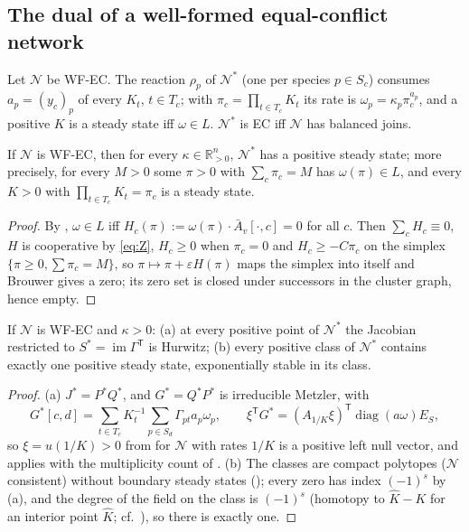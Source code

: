 \documentclass[11pt,a4paper]{report}
\newcommand{\Net}{\mathcal{N}}
\newcommand{\Nd}{\mathcal{N}^{*}}
\newcommand{\im}{\operatorname{im}}
\newcommand{\Rp}{\mathbb{R}_{>0}}
\newcommand{\tp}{^{\mathsf T}}
\begin{document}
\subsection{The dual of a well-formed equal-conflict network}

Let \(\Net\) be WF-EC. The reaction \(\rho_p\) of \(\Nd\) (one per species \(p\in S_c\)) consumes \(a_p=(y_c)_p\) of
every \(K_t\), \(t\in T_c\); with \(\pi_c=\prod_{t\in T_c}K_t\) its rate is \(\omega_p=\kappa_p\pi_c^{a_p}\), and a positive
\(K\) is a steady state iff \(\omega\in L\). \(\Nd\) is EC iff \(\Net\) has balanced joins.

\begin{theorem}\label{thm:Tstar}
If \(\Net\) is WF-EC, then for every \(\kappa\in\Rp^n\), \(\Nd\) has a positive steady state; more precisely, for every
\(M>0\) some \(\pi>0\) with \(\sum_c\pi_c=M\) has \(\omega(\pi)\in L\), and every \(K>0\) with \(\prod_{t\in T_c}K_t=\pi_c\) is
a steady state.
\end{theorem}
\begin{proof}
By , \(\omega\in L\) iff \(H_c(\pi):=\omega(\pi)\cdot\bar A_v[\cdot,c]=0\) for all \(c\). Then
\(\sum_cH_c\equiv0\), \(H\) is cooperative by \eqref{eq:Z}, \(H_c\ge0\) when \(\pi_c=0\) and \(H_c\ge-C\pi_c\) on the
simplex \(\{\pi\ge0,\sum\pi_c=M\}\), so \(\pi\mapsto\pi+\varepsilon H(\pi)\) maps the simplex into itself and Brouwer
gives a zero; its zero set is closed under successors in the cluster graph, hence empty.
\end{proof}

\begin{theorem}\label{thm:Ustar}
If \(\Net\) is WF-EC and \(\kappa>0\): (a) at every positive point of \(\Nd\) the Jacobian restricted to
\(S^*=\im\Gamma\tp\) is Hurwitz; (b) every positive class of \(\Nd\) contains exactly one positive steady state,
exponentially stable in its class.
\end{theorem}
\begin{proof}
(a) \(J^*=P^*Q^*\), and \(G^*=Q^*P^*\) is irreducible Metzler, with
\[G^*[c,d]=\sum_{t\in T_c}K_t^{-1}\sum_{p\in S_d}\Gamma_{pt}a_p\omega_p,\qquad
\xi\tp G^*=(A_{1/K}\xi)\tp\operatorname{diag}(a\omega)E_S,\]
so \(\xi=u(1/K)>0\) from
 for \(\Net\) with rates \(1/K\) is a positive left null vector, and  applies with the
multiplicity count of . (b) The classes are compact polytopes (\(\Net\) consistent) without boundary
steady states (); every zero has index \((-1)^s\) by (a), and the degree of the field on the class is
\((-1)^s\) (homotopy to \(\hat K-K\) for an interior point \(\hat K\); cf.~\autocite[Thm~1]{ConradiFeliuMinchevaWiuf2017}),
so there is exactly one.
\end{proof}
\end{document}
